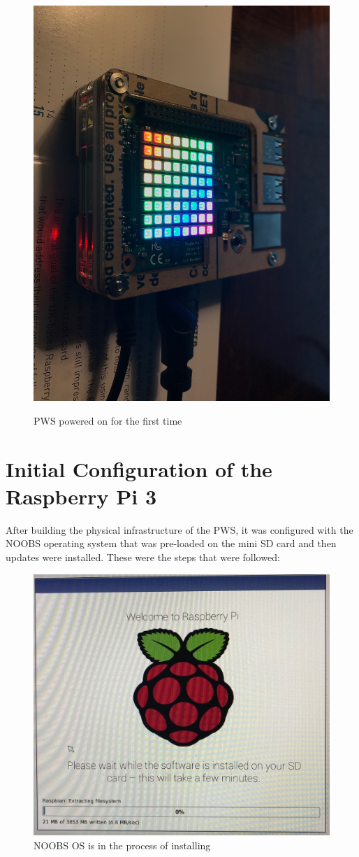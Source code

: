 \documentclass[sigconf]{acmart}
\begin{document}
\begin{figure}[p]
\bigskip

    {\centering
    \includegraphics[width=0.6\columnwidth]{images/ON.jpg}}
    \caption{PWS powered on for the first time}
\end{figure}


\section{Initial Configuration of the Raspberry Pi 3}

After building the physical infrastructure of the PWS, it was configured with the NOOBS operating system that was pre-loaded on the mini SD card and then updates were installed. These were the steps that were followed:



\begin{figure}[htb]
    \centering
    \includegraphics[width=0.5\columnwidth]{images/Raspbian_Boot.jpg}
    \caption{NOOBS OS is in the process of installing}
\end{figure}
\end{document}

